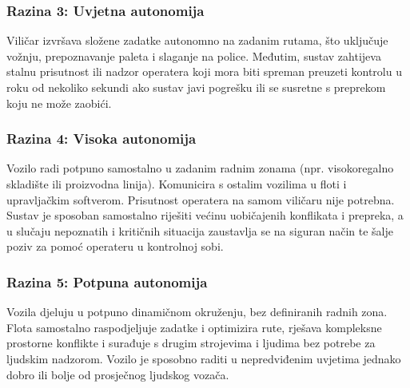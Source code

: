 \documentclass[12pt,a4paper]{article}
\begin{document}
\subsubsection{Razina 3: Uvjetna autonomija}
Viličar izvršava složene zadatke autonomno na zadanim rutama, što uključuje vožnju, prepoznavanje paleta i slaganje na police. Međutim, sustav zahtijeva stalnu prisutnost ili nadzor operatera koji mora biti spreman preuzeti kontrolu u roku od nekoliko sekundi ako sustav javi pogrešku ili se susretne s preprekom koju ne može zaobići.

\subsubsection{Razina 4: Visoka autonomija}
Vozilo radi potpuno samostalno u zadanim radnim zonama (npr. visokoregalno skladište ili proizvodna linija). Komunicira s ostalim vozilima u floti i upravljačkim softverom. Prisutnost operatera na samom viličaru nije potrebna. Sustav je sposoban samostalno riješiti većinu uobičajenih konflikata i prepreka, a u slučaju nepoznatih i kritičnih situacija zaustavlja se na siguran način te šalje poziv za pomoć operateru u kontrolnoj sobi.

\subsubsection{Razina 5: Potpuna autonomija}
Vozila djeluju u potpuno dinamičnom okruženju, bez definiranih radnih zona. Flota samostalno raspodjeljuje zadatke i optimizira rute, rješava kompleksne prostorne konflikte i surađuje s drugim strojevima i ljudima bez potrebe za ljudskim nadzorom. Vozilo je sposobno raditi u nepredviđenim uvjetima jednako dobro ili bolje od prosječnog ljudskog vozača.
\end{document}
